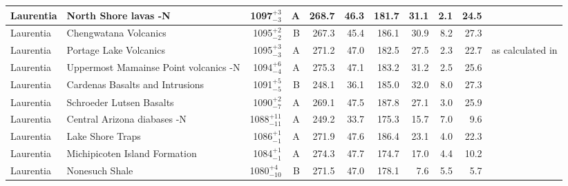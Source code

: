 \documentclass[twocolumn, switch]{article} %
\begin{document}
{\begin{landscape}
\begin{ThreePartTable}
\begin{longtable}{p{1.4 in}p{1.2 in}rrrrrrrrp{1.2 in}}
                     Laurentia &                               North Shore lavas -N &     1097$^{+3}_{-3}$ &      A &     268.7 &      46.3 & 181.7 &  31.1 &       2.1 &        24.5 &              \cite{Tauxe2009a,Swanson-Hysell2019a} \\ \hline
                     Laurentia &                              Chengwatana Volcanics &     1095$^{+2}_{-2}$ &      B &     267.3 &      45.4 & 186.1 &  30.9 &       8.2 &        27.3 &                                   \cite{Kean1997a} \\ \hline
                     Laurentia &                             Portage Lake Volcanics &     1095$^{+3}_{-3}$ &      A &     271.2 &      47.0 & 182.5 &  27.5 &       2.3 &        22.7 &  \cite{Books1972a, Hnat2006a} as calculated in \cite{Swanson-Hysell2019a} \\ \hline
                     Laurentia &              Uppermost Mamainse Point volcanics -N &     1094$^{+6}_{-4}$ &      A &     275.3 &      47.1 & 183.2 &  31.2 &       2.5 &        25.6 &                         \cite{Swanson-Hysell2014a} \\ \hline
                     Laurentia &                    Cardenas Basalts and Intrusions &     1091$^{+5}_{-5}$ &      B &     248.1 &      36.1 & 185.0 &  32.0 &       8.0 &        27.3 &                                   \cite{Weil2003a} \\ \hline
                     Laurentia &                           Schroeder Lutsen Basalts &     1090$^{+2}_{-7}$ &      A &     269.1 &      47.5 & 187.8 &  27.1 &       3.0 &        25.9 &                              \cite{Fairchild2017a} \\ \hline
                     Laurentia &                        Central Arizona diabases -N &   1088$^{+11}_{-11}$ &      A &     249.2 &      33.7 & 175.3 &  15.7 &       7.0 &         9.6 &                               \cite{Donadini2011b} \\ \hline
                     Laurentia &                                   Lake Shore Traps &     1086$^{+1}_{-1}$ &      A &     271.9 &      47.6 & 186.4 &  23.1 &       4.0 &        22.3 &                                \cite{Kulakov2013a} \\ \hline
                     Laurentia &                      Michipicoten Island Formation &     1084$^{+1}_{-1}$ &      A &     274.3 &      47.7 & 174.7 &  17.0 &       4.4 &        10.2 &                              \cite{Fairchild2017a} \\ \hline
                     Laurentia &                                     Nonesuch Shale &    1080$^{+4}_{-10}$ &      B &     271.5 &      47.0 & 178.1 &   7.6 &       5.5 &         5.7 &                                  \cite{Henry1977a} \\ \hline

\end{longtable}
\end{ThreePartTable}
\end{landscape}}
\end{document}
